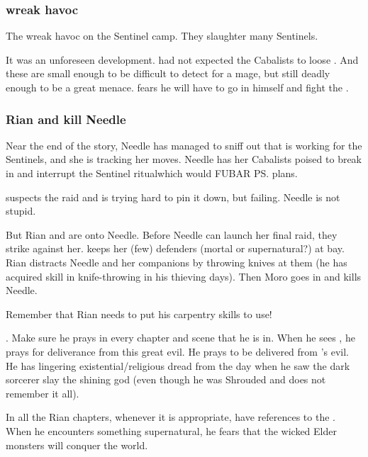 \subsubsection{\Banes wreak havoc}
The \banes wreak havoc on the Sentinel camp. 
They slaughter many Sentinels. 

It was an unforeseen development.
\Psyrex had not expected the Cabalists to loose \banes. 
And these \lesserbanes are small enough to be difficult to detect for a mage, but still deadly enough to be a great menace. 
\Psyrex fears he will have to go in himself and fight the \banes. 





\subsubsection{Rian and \Cobrel{} kill Needle}
Near the end of the story, Needle has managed to sniff out that \Tiroco{} is working for the Sentinels, and she is tracking her moves. 
Needle has her Cabalists poised to break in and interrupt the Sentinel ritual\dash which would FUBAR \ps{\Secherdamon} plans. 

\Psyrex{} suspects the raid and is trying hard to pin it down, but failing. 
Needle is not stupid. 

But Rian and \Cobrel{} are onto Needle. 
Before Needle can launch her final raid, they strike against her. 
\Cobrel{} keeps her (few) defenders (mortal or supernatural?) at bay. 
Rian distracts Needle and her companions by throwing knives at them (he has acquired skill in knife-throwing in his thieving days). 
Then Moro goes in and kills Needle. 

Remember that Rian needs to put his carpentry skills to use! 
    
.
Make sure he prays in every chapter and scene that he is in.
When he sees \Ishnaruchaefir, he prays for deliverance from this great evil.
He prays to be delivered from \Isphet's evil. 
He has lingering existential/religious dread from the day when he saw the dark sorcerer slay the shining god (even though he was Shrouded and does not remember it all). 

In all the Rian chapters, whenever it is appropriate, have references to the . 
When he encounters something supernatural, he fears that the wicked Elder monsters will conquer the world. 





